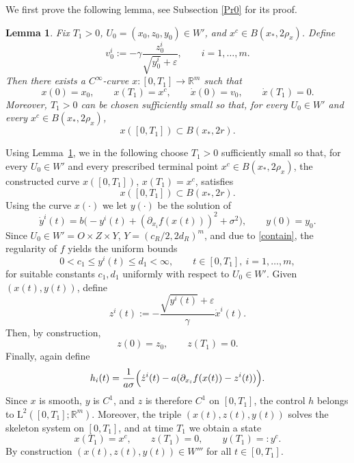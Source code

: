 \documentclass[11pt, a4paper,leqno]{amsart}
\newtheorem{lemma}{Lemma}[section]
\theoremstyle{definition}
\numberwithin{equation}{section}
\begin{document}
We first prove the following lemma, see Subsection \ref{Pr0} for its proof.
\begin{lemma}\label{lem:initial-hermite-path}
Fix \(T_1>0\), \(U_0=(x_0,z_0,y_0)\in W'\), and \(x^c\in B(x_\ast,2\rho_x)\).
Define
\[
v_0^i:=-\gamma\frac{z_0^i}{\sqrt{y_0^i}+\varepsilon},
\qquad i=1,\dots,m.
\]
Then there exists a \(C^\infty\)-curve $x:[0,T_1]\to \mathbb R^m$ such that
\[
x(0)=x_0,\qquad x(T_1)=x^c,\qquad \dot x(0)=v_0,\qquad \dot x(T_1)=0.
\]
Moreover, \(T_1>0\) can be chosen sufficiently small so that, for every
\(U_0\in W'\) and every \(x^c\in B(x_\ast,2\rho_x)\),
\[
x([0,T_1])\subset B(x_\ast,2r).
\]
\end{lemma}




Using Lemma~\ref{lem:initial-hermite-path}, we in the following choose \(T_1>0\) sufficiently small so that, for every
\(U_0\in W'\) and every prescribed terminal point \(x^c\in B(x_\ast,2\rho_x)\), the constructed curve $x([0,T_1])$, $x(T_1)=x^c$, satisfies
\begin{equation}\label{contain}
x([0,T_1])\subset B(x_\ast,2r).
\end{equation}
Using the curve \(x(\cdot)\) we let \(y(\cdot)\) be the solution of
\[
\dot y^i(t)=b\bigl(-y^i(t)+(\partial_{x_i}f(x(t)))^2+\sigma^2\bigr),
\qquad y(0)=y_0.
\]
Since \(U_0\in W'=O\times Z\times Y\), \(Y=(c_R/2,2d_R)^m\),  and due to \eqref{contain}, the regularity of $f$  yields the uniform bounds
\[
0<c_1\le y^i(t)\le d_1<\infty,
\qquad t\in[0,T_1],\ i=1,\dots,m,
\]
for suitable constants \(c_1,d_1\) uniformly with respect to \(U_0\in W'\). Given $(x(t),y(t))$, define
\[
z^i(t):=-\frac{\sqrt{y^i(t)}+\varepsilon}{\gamma}\dot x^i(t).
\]
Then, by construction,
\[
z(0)=z_0,\qquad z(T_1)=0.
\]
Finally, again define
\[
h_i(t)=\frac1{a\sigma}\Bigl(\dot z^i(t)-a(\partial_{x_i}f(x(t))-z^i(t))\Bigr).
\]
Since \(x\) is smooth, \(y\) is \(C^1\), and \(z\) is therefore \(C^1\) on
\([0,T_1]\), the control \(h\) belongs to \(\mathrm L^2([0,T_1];\mathbb R^m)\).
Moreover, the triple \((x(t),z(t),y(t))\) solves the skeleton system on
\([0,T_1]\), and at time \(T_1\) we obtain a state
\begin{equation}\label{state1}
x(T_1)=x^c,\qquad z(T_1)=0,\qquad y(T_1)=:y^c.
\end{equation}
By construction $(x(t),z(t),y(t))\in W'''$ for all $t\in [0,T_1]$.
\end{document}
